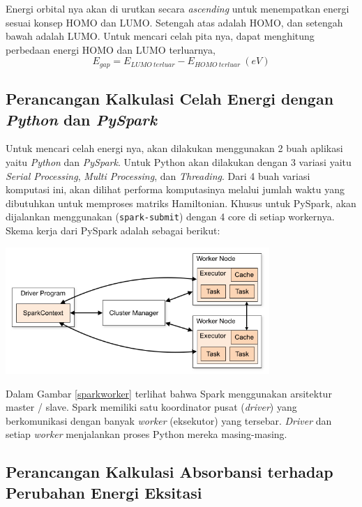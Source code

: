 \documentclass[12pt,a4paper]{report}
\begin{document}
	Energi orbital nya akan di urutkan secara \textit{ascending} untuk menempatkan energi sesuai konsep HOMO dan LUMO. Setengah atas adalah HOMO, dan setengah bawah adalah LUMO. Untuk mencari celah pita nya, dapat menghitung perbedaan energi HOMO dan LUMO terluarnya,
	\begin{equation}
	E_{gap} = E_{LUMO \ terluar} - E_{HOMO \ terluar} \ (eV)
	\end{equation}
	
	\subsection{Perancangan Kalkulasi Celah Energi dengan \textit{Python} dan \textit{PySpark}}
	
	Untuk mencari celah energi nya, akan dilakukan menggunakan 2 buah aplikasi yaitu \textit{Python} dan \textit{PySpark}. Untuk Python akan dilakukan dengan 3 variasi yaitu \textit{Serial Processing}, \textit{Multi Processing}, dan \textit{Threading}. Dari 4 buah variasi komputasi ini, akan dilihat performa komputasinya melalui jumlah waktu yang dibutuhkan untuk memproses matriks Hamiltonian. Khusus untuk PySpark, akan dijalankan menggunakan (\lstinline{spark-submit}) dengan 4 core di setiap workernya. Skema kerja dari PySpark adalah sebagai berikut:
	
	\begin{center}
		\includegraphics[width=10cm]{gambar/skem.png}
		\label{sparkworker}
	\end{center}
	Dalam Gambar \ref{sparkworker} terlihat bahwa Spark menggunakan arsitektur master / slave. Spark memiliki satu koordinator pusat (\textit{driver}) yang berkomunikasi dengan banyak \textit{worker} (eksekutor) yang tersebar. \textit{Driver} dan setiap \textit{worker} menjalankan proses Python mereka masing-masing.
	
	\subsection{Perancangan Kalkulasi Absorbansi terhadap Perubahan Energi Eksitasi}
	
\end{document}
